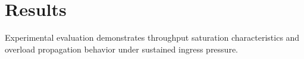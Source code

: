 \section{Results}

Experimental evaluation demonstrates throughput saturation characteristics and overload propagation behavior under sustained ingress pressure.
